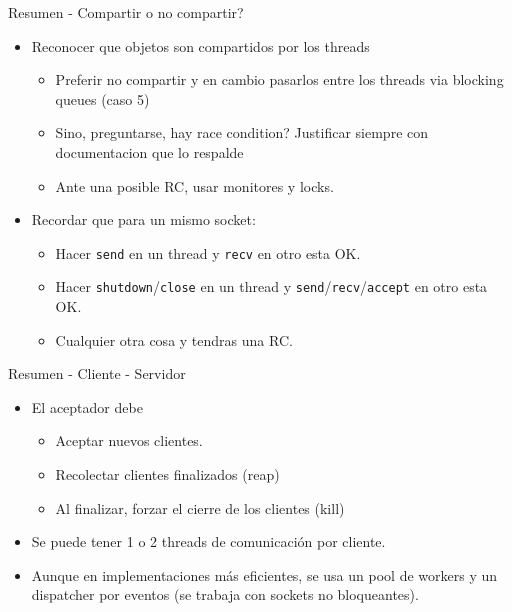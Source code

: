 \begin{frame}[fragile]{Resumen - Compartir o no compartir?}
   \begin{itemize}
      \item<1-> Reconocer que objetos son compartidos por los threads
       \begin{itemize}
           \item<2-> Preferir no compartir y en cambio pasarlos entre los threads via blocking queues (caso 5)
           \item<2-> Sino, preguntarse, hay race condition? Justificar siempre con documentacion que lo respalde
           \item<2-> Ante una posible RC, usar monitores y locks.
       \end{itemize}
   \item<3-> Recordar que para un mismo socket:
       \begin{itemize}
            \item<3-> Hacer \lstinline[style=normal]!send! en un thread y \lstinline[style=normal]!recv! en otro esta OK.
            \item<3-> Hacer \lstinline[style=normal]!shutdown!/\lstinline[style=normal]!close! en un thread y \lstinline[style=normal]!send!/\lstinline[style=normal]!recv!/\lstinline[style=normal]!accept! en otro esta OK.
            \item<3-> Cualquier otra cosa y tendras una RC.
       \end{itemize}
   \end{itemize}
\end{frame}

\begin{frame}[fragile]{Resumen - Cliente - Servidor}
   \begin{itemize}
      \item<1-> El aceptador debe
       \begin{itemize}
           \item<1-> Aceptar nuevos clientes.
           \item<1-> Recolectar clientes finalizados (reap)
           \item<1-> Al finalizar, forzar el cierre de los clientes (kill)
       \end{itemize}
      \item<2-> Se puede tener 1 o 2 threads de comunicaci\'on por cliente.
      \item<3-> Aunque en implementaciones m\'as eficientes, se usa un pool de workers y un dispatcher por eventos (se trabaja con sockets no bloqueantes).
   \end{itemize}
\end{frame}






